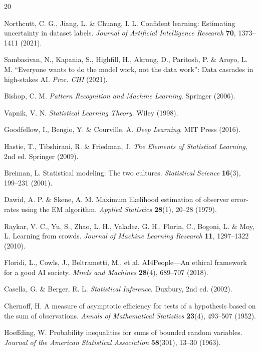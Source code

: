 \documentclass[12pt,a4paper]{article}
\theoremstyle{definition}
\theoremstyle{plain}
\theoremstyle{remark}
\begin{document}
\begin{thebibliography}{20}

 Northcutt, C. G., Jiang, L. \& Chuang, I. L. Confident learning: Estimating uncertainty in dataset labels. \textit{Journal of Artificial Intelligence Research} \textbf{70}, 1373--1411 (2021).

 Sambasivan, N., Kapania, S., Highfill, H., Akrong, D., Paritosh, P. \& Aroyo, L. M. ``Everyone wants to do the model work, not the data work'': Data cascades in high-stakes AI. \textit{Proc. CHI} (2021).

 Bishop, C. M. \textit{Pattern Recognition and Machine Learning}. Springer (2006).

 Vapnik, V. N. \textit{Statistical Learning Theory}. Wiley (1998).

 Goodfellow, I., Bengio, Y. \& Courville, A. \textit{Deep Learning}. MIT Press (2016).

 Hastie, T., Tibshirani, R. \& Friedman, J. \textit{The Elements of Statistical Learning}, 2nd ed. Springer (2009).

 Breiman, L. Statistical modeling: The two cultures. \textit{Statistical Science} \textbf{16}(3), 199--231 (2001).

 Dawid, A. P. \& Skene, A. M. Maximum likelihood estimation of observer error-rates using the EM algorithm. \textit{Applied Statistics} \textbf{28}(1), 20--28 (1979).

 Raykar, V. C., Yu, S., Zhao, L. H., Valadez, G. H., Florin, C., Bogoni, L. \& Moy, L. Learning from crowds. \textit{Journal of Machine Learning Research} \textbf{11}, 1297--1322 (2010).

 Floridi, L., Cowls, J., Beltrametti, M., et al. AI4People---An ethical framework for a good AI society. \textit{Minds and Machines} \textbf{28}(4), 689--707 (2018).

 Casella, G. \& Berger, R. L. \textit{Statistical Inference}. Duxbury, 2nd ed. (2002).

 Chernoff, H. A measure of asymptotic efficiency for tests of a hypothesis based on the sum of observations. \textit{Annals of Mathematical Statistics} \textbf{23}(4), 493--507 (1952).

 Hoeffding, W. Probability inequalities for sums of bounded random variables. \textit{Journal of the American Statistical Association} \textbf{58}(301), 13--30 (1963).


\end{thebibliography}
\end{document}
